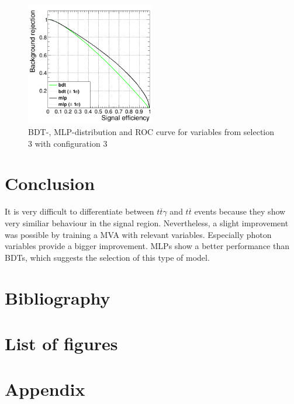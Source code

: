 \documentclass[11pt]{scrartcl}
\begin{document}
\begin{figure}[H]
\begin{minipage}{.5\textwidth}
	  \label{fig:distr_s3_config3_mlp}
	\end{minipage}
	\centering
	\includegraphics[width=0.5\textwidth]{figures/MVA/select3/config3/FOM_selection3_nL10_nT1000_mD5_nC50.png}
	\caption{BDT-, MLP-distribution and ROC curve for variables from selection 3 with configuration 3}
	 \label{fig:ROC_s3_config3}	
	\end{figure}
				
\section{Conclusion}
It is very difficult to differentiate between $t\overline{t}\gamma$ and $t\overline{t}$ events because they show very similiar behaviour in the signal region. Nevertheless, a slight improvement was possible by training a MVA with relevant variables. Especially photon variables provide a bigger improvement. MLPs show a better performance than BDTs, which suggests the selection of this type of model.

\section{Bibliography}

\section{List of figures}

\section{Appendix}
\end{document}
